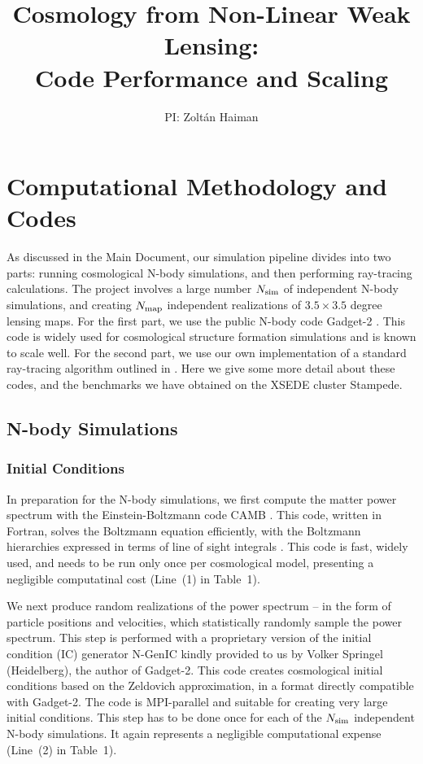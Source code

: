 \documentclass[10pt, preprint]{aastex}
\begin{document}


\title{Cosmology from Non-Linear Weak Lensing:\\Code Performance and Scaling}

\author{PI: Zolt\'an Haiman}


\section{Computational Methodology and Codes} \label{sec:methods}

As discussed in the Main Document, our simulation pipeline divides
into two parts: running cosmological N-body simulations, and then
performing ray-tracing calculations.  The project involves a large
number $N_{\rm sim}$ of independent N-body simulations, and creating
$N_{\rm map}$ independent realizations of $3.5\times3.5$ degree
lensing maps.  For the first part, we use the public N-body code
Gadget-2 \citep{VS05}.  This code is widely used for cosmological
structure formation simulations and is known to scale well.  For the
second part, we use our own implementation of a standard ray-tracing
algorithm outlined in \citet{H&M01}.  Here we give some more detail
about these codes, and the benchmarks we have obtained on the XSEDE
cluster Stampede.

\subsection{N-body Simulations}

\subsubsection{Initial Conditions}

In preparation for the N-body simulations, we first compute the matter
power spectrum with the Einstein-Boltzmann code CAMB \citep{CAMB}.
This code, written in Fortran, solves the Boltzmann equation
efficiently, with the Boltzmann hierarchies expressed in terms of line
of sight integrals \citep{CMBFAST}.    This code is fast, widely used,
and needs to be run only once per cosmological model, presenting a negligible
computatinal cost (Line~(1) in Table~1).

We next produce random realizations of the power spectrum -- in the
form of particle positions and velocities, which statistically
randomly sample the power spectrum.  This step is performed with a
proprietary version of the initial condition (IC) generator N-GenIC
kindly provided to us by Volker Springel (Heidelberg), the author of
Gadget-2.  This code creates cosmological initial conditions based on
the Zeldovich approximation, in a format directly compatible with
Gadget-2.  The code is MPI-parallel and suitable for creating very
large initial conditions.  This step has to be done once for each of
the $N_{\rm sim}$ independent N-body simulations. It again represents
a negligible computational expense (Line~(2) in Table~1).
\end{document}
